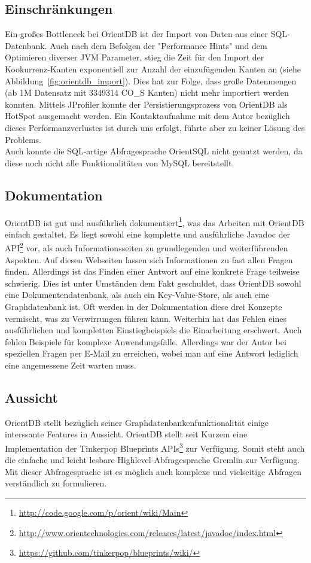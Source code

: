 \documentclass[11pt, a4paper, oneside]{article} %
\begin{document}
\subsection{Einschränkungen}
Ein großes Bottleneck bei OrientDB ist der Import von Daten aus einer SQL-Datenbank. Auch nach dem Befolgen der "Performance Hints" und dem Optimieren diverser JVM Parameter, stieg die Zeit für den Import der Kookurrenz-Kanten exponentiell zur Anzahl der einzufügenden Kanten an (siehe Abbildung~\ref{fig:orientdb_import}). Dies hat zur Folge, dass große Datenmengen (ab 1M Datensatz mit 3349314 CO\_{}S Kanten) nicht mehr importiert werden konnten. Mittels JProfiler konnte der Persistierungsprozess von OrientDB als HotSpot ausgemacht werden. Ein Kontaktaufnahme mit dem Autor bezüglich dieses Performanzverlustes ist durch uns erfolgt, führte aber zu keiner Lösung des Problems.\\
Auch konnte die SQL-artige Abfragesprache OrientSQL nicht genutzt werden, da diese noch nicht alle Funktionalitäten von MySQL bereitstellt.



\subsection{Dokumentation}
OrientDB ist gut und ausführlich dokumentiert\footnote{\url{http://code.google.com/p/orient/wiki/Main}}, was das Arbeiten mit OrientDB einfach gestaltet. Es liegt sowohl eine komplette und ausführliche Javadoc der API\footnote{\url{http://www.orientechnologies.com/releases/latest/javadoc/index.html}} vor, als auch Informationsseiten zu grundlegenden und weiterführenden Aspekten. Auf diesen Webseiten lassen sich Informationen zu fast allen Fragen finden. Allerdings ist das Finden einer Antwort auf eine konkrete Frage teilweise schwierig. Dies ist unter Umständen dem Fakt geschuldet, dass OrientDB sowohl eine Dokumentendatenbank, als auch ein Key-Value-Store, als auch eine Graphdatenbank ist. Oft werden in der Dokumentation diese drei Konzepte vermischt, was zu Verwirrungen führen kann. Weiterhin hat das Fehlen eines ausführlichen und kompletten Einstiegbeispiels die Einarbeitung erschwert. Auch fehlen Beispiele für komplexe Anwendungsfälle. Allerdings war der Autor bei speziellen Fragen per E-Mail zu erreichen, wobei man auf eine Antwort lediglich eine angemessene Zeit warten muss.



\subsection{Aussicht}
OrientDB stellt bezüglich seiner Graphdatenbankenfunktionalität einige interssante Features in Aussicht. OrientDB stellt seit Kurzem eine Implementation der Tinkerpop Blueprints APIs\footnote{\url{https://github.com/tinkerpop/blueprints/wiki/}} zur Verfügung. Somit steht auch die einfache und leicht lesbare Highlevel-Abfragesprache Gremlin zur Verfügung. Mit dieser Abfragesprache ist es möglich auch komplexe und vielseitige Abfragen verständlich zu formulieren.
\end{document}
